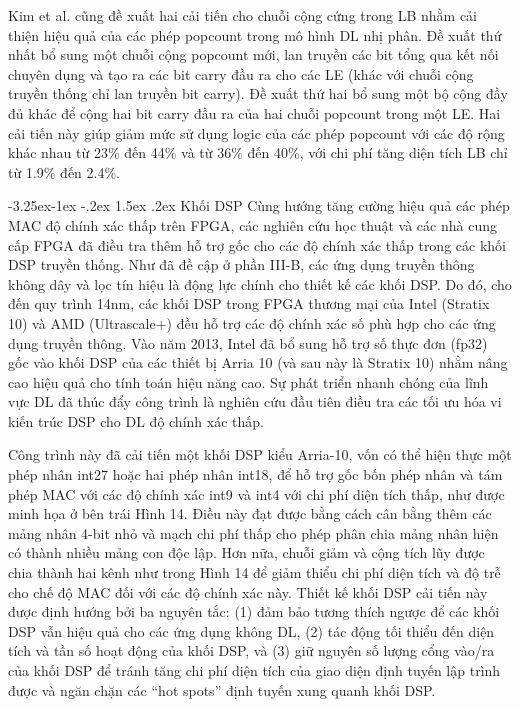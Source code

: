 \documentclass[a4paper]{article}
\makeatletter
\newcounter {subsubsubsection}[subsubsection]
\newcommand\subsubsubsection{\@startsection{subsubsubsection}{4}{\z@}%
                                     {-3.25ex\@plus -1ex \@minus -.2ex}%
                                     {1.5ex \@plus .2ex}%
                                     {\normalfont\normalsize\bfseries}}
\makeatother
\begin{document}
Kim et al. cũng đề xuất hai cải tiến cho chuỗi cộng cứng trong LB nhằm cải thiện hiệu quả của các phép popcount trong mô hình DL nhị phân. Đề xuất thứ nhất bổ sung một chuỗi cộng popcount mới, lan truyền các bit tổng qua kết nối chuyên dụng và tạo ra các bit carry đầu ra cho các LE (khác với chuỗi cộng truyền thống chỉ lan truyền bit carry). Đề xuất thứ hai bổ sung một bộ cộng đầy đủ khác để cộng hai bit carry đầu ra của hai chuỗi popcount trong một LE. Hai cải tiến này giúp giảm mức sử dụng logic của các phép popcount với các độ rộng khác nhau từ 23\% đến 44\% và từ 36\% đến 40\%, với chi phí tăng diện tích LB chỉ từ 1.9\% đến 2.4\%.
 
\subsubsubsection{Khối DSP}
Cùng hướng tăng cường hiệu quả các phép MAC độ chính xác thấp trên FPGA, các nghiên cứu học thuật và các nhà cung cấp FPGA đã điều tra thêm hỗ trợ gốc cho các độ chính xác thấp trong các khối DSP truyền thống. Như đã đề cập ở phần III-B, các ứng dụng truyền thông không dây và lọc tín hiệu là động lực chính cho thiết kế các khối DSP. Do đó, cho đến quy trình 14nm, các khối DSP trong FPGA thương mại của Intel (Stratix 10) và AMD (Ultrascale+) đều hỗ trợ các độ chính xác số phù hợp cho các ứng dụng truyền thông. Vào năm 2013, Intel đã bổ sung hỗ trợ số thực đơn (fp32) gốc vào khối DSP của các thiết bị Arria 10 (và sau này là Stratix 10) nhằm nâng cao hiệu quả cho tính toán hiệu năng cao. Sự phát triển nhanh chóng của lĩnh vực DL đã thúc đẩy công trình là nghiên cứu đầu tiên điều tra các tối ưu hóa vi kiến trúc DSP cho DL độ chính xác thấp.

Công trình này đã cải tiến một khối DSP kiểu Arria-10, vốn có thể hiện thực một phép nhân int27 hoặc hai phép nhân int18, để hỗ trợ gốc bốn phép nhân và tám phép MAC với các độ chính xác int9 và int4 với chi phí diện tích thấp, như được minh họa ở bên trái Hình 14. Điều này đạt được bằng cách cân bằng thêm các mảng nhân 4-bit nhỏ và mạch chi phí thấp cho phép phân chia mảng nhân hiện có thành nhiều mảng con độc lập. Hơn nữa, chuỗi giảm và cộng tích lũy được chia thành hai kênh như trong Hình 14 để giảm thiểu chi phí diện tích và độ trễ cho chế độ MAC đối với các độ chính xác này. Thiết kế khối DSP cải tiến này được định hướng bởi ba nguyên tắc: (1) đảm bảo tương thích ngược để các khối DSP vẫn hiệu quả cho các ứng dụng không DL, (2) tác động tối thiểu đến diện tích và tần số hoạt động của khối DSP, và (3) giữ nguyên số lượng cổng vào/ra của khối DSP để tránh tăng chi phí diện tích của giao diện định tuyến lập trình được và ngăn chặn các “hot spots” định tuyến xung quanh khối DSP.
\end{document}
